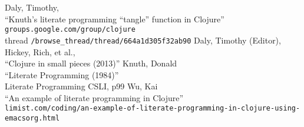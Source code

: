 \documentclass{book}
\begin{document}
\cleardoublepage
{}
{}
\begin{thebibliography}{99}
Daly, Timothy,\\
 “Knuth's literate programming “tangle” function in Clojure”\\
\verb|groups.google.com/group/clojure|\\
thread \verb|/browse_thread/thread/664a1d305f32ab90|
Daly, Timothy (Editor), Hickey, Rich, et al.,\\
“Clojure in small pieces (2013)”
 Knuth, Donald\\ 
“Literate Programming (1984)” \\
Literate Programming CSLI, p99
 Wu, Kai\\
“An example of literate programming in Clojure”\\
\verb|limist.com/coding/an-example-of-literate-programming-in-clojure-using-emacsorg.html|
\end{thebibliography}
\clearpage
\paragraph{} %
\printindex
\end{document}

